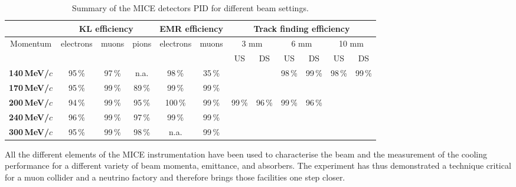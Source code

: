 \begin{table}[htb!]
\begin{tabular}{c|ccc|cc|cc|cc|cc}
 &
  \multicolumn{3}{c|}{\textbf{KL efficiency}} &
  \multicolumn{2}{c|}{\textbf{EMR efficiency}} &
  \multicolumn{6}{c}{\textbf{Track finding efficiency}} \\ 
  \hline
  \multirow{2}{*}{Momentum} &
  \multirow{2}{*}{electrons} &
  \multirow{2}{*}{muons} &
  \multirow{2}{*}{pions} &
  \multirow{2}{*}{electrons} &
  \multirow{2}{*}{muons} &
  \multicolumn{2}{c|}{3 mm} &
  \multicolumn{2}{c|}{6 mm} &
  \multicolumn{2}{c}{10 mm} \\  
             &      &      &      &       &      & US   & DS   & US   & DS   & US   & DS   \\ \hline
\textbf{140\,MeV/$c$} & 95\,\% & 97\,\% & n.a.   & 98\,\%  & 35\,\% &        &      & 98\,\%   & 99\,\% & 98\,\% & 99\,\% \\ \hline
\textbf{170\,MeV/$c$} & 95\,\% & 99\,\% & 89\,\% & 99\,\%  & 99\,\% &        &      &          &        &        &      \\ \hline
\textbf{200\,MeV/$c$} & 94\,\% & 99\,\% & 95\,\% & 100\,\% & 99\,\% & 99\,\% & 96\,\% & 99\,\% & 96\,\% &        &      \\ \hline
\textbf{240\,MeV/$c$} & 96\,\% & 99\,\% & 97\,\% & 99\,\%  & 99\,\% &        &      &          &        &        &      \\ \hline
\textbf{300\,MeV/$c$} & 95\,\% & 99\,\% & 98\,\% & n.a.    & 99\,\% &        &      &          &        &        &     
\end{tabular}
	\caption{Summary of the MICE detectors PID for different beam settings.}
	\label{tab:pid2}
\end{table}
All the different elements of the MICE instrumentation have been used to characterise the beam and the measurement of the cooling performance for a different variety of beam momenta, emittance, and absorbers.
The experiment has thus demonstrated a technique critical for a muon collider and a neutrino factory and therefore brings those facilities one step closer.
